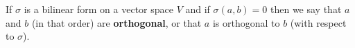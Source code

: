 If $\sigma$ is a bilinear form on a vector space $V$ and if $\sigma(a, b) = 0$ then we say that $a$ and $b$ (in that order) are \textbf{orthogonal}, or that $a$ is orthogonal to $b$ (with respect to $\sigma$).
